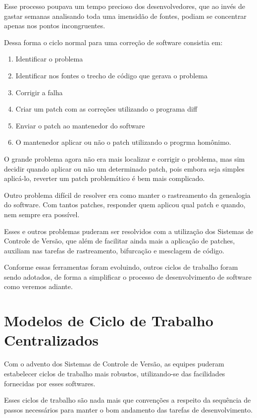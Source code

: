 Esse processo poupava um tempo precioso dos desenvolvedores, que ao invés de gastar semanas analisando toda uma imensidão de fontes, podiam se concentrar apenas nos pontos incongruentes.

Dessa forma o ciclo normal para uma correção de software consistia em:

\begin{enumerate}
\item Identificar o problema
\item Identificar nos fontes o trecho de código que gerava o problema
\item Corrigir a falha
\item Criar um patch com as correções utilizando o programa diff
\item Enviar o patch ao mantenedor do software
\item O mantenedor aplicar ou não o patch utilizando o progrma homônimo.
\end{enumerate}

O grande problema agora não era mais localizar e corrigir o problema, mas sim decidir quando aplicar ou não um determinado patch, pois embora seja simples aplicá-lo, reverter um patch problemático é bem mais complicado.

Outro problema difícil de resolver era como manter o rastreamento da genealogia do software. Com tantos patches, responder quem aplicou qual patch e quando, nem sempre era possível.

Esses e outros problemas puderam ser resolvidos com a utilização dos Sistemas de Controle de Versão, que além de facilitar ainda mais a aplicação de patches, auxiliam nas tarefas de rastreamento, bifurcação e mesclagem de código.

Conforme essas ferramentas foram evoluindo, outros ciclos de trabalho foram sendo adotados, de forma a simplificar o processo de desenvolvimento de software como veremos adiante.

\section{Modelos de Ciclo de Trabalho Centralizados}

Com o advento dos Sistemas de Controle de Versão, as equipes puderam estabelecer ciclos de trabalho mais robustos, utilizando-se das facilidades fornecidas por esses softwares.

Esses ciclos de trabalho são nada mais que convenções a respeito da sequência de passos necessários para manter o bom andamento das tarefas de desenvolvimento.

